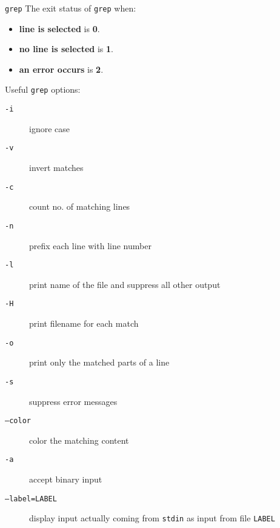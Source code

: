 \documentclass[11pt]{beamer}
\begin{document}
			\begin{frame}[t, fragile]{\texttt{grep}}
				The exit status of \texttt{grep} when:
				\begin{itemize}
					\item \textbf{line is selected} is \textbf{0}.
					\item \textbf{no line is selected} is \textbf{1}.
					\item \textbf{an error occurs} is \textbf{2}.
				\end{itemize}
				Useful \texttt{grep} options:
				\begin{description}
					\item[ \texttt{-i}] ignore case
					\item[ \texttt{-v}] invert matches
					\item[ \texttt{-c}] count no. of matching lines
					\item[ \texttt{-n}] prefix each line with line number
					\item[ \texttt{-l}] print name of the file and suppress all other output
					\item[ \texttt{-H}] print filename for each match
					\item[ \texttt{-o}] print only the matched parts of a line
					\item[ \texttt{-s}] suppress error messages
					\item[ \texttt{--color}] color the matching content
					\item[ \texttt{-a} ] accept binary input
					\item[ \texttt{--label=LABEL}] display input actually coming from \texttt{stdin} as input from file \texttt{LABEL}
				\end{description}
			\end{frame}
\end{document}
